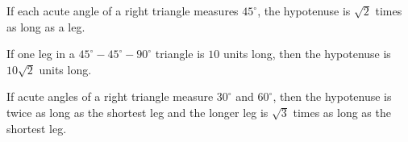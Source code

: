 \begin{theorem}
	If each acute angle of a right triangle measures $45^{\circ}$, the hypotenuse
	is $\sqrt{2}$ times as long as a leg.

	\begin{figure}[H]
		\centering


		\label{fig:45_45_90_triangle}
	\end{figure}
\end{theorem}

\begin{example}
	If one leg in a $45^{\circ}-45^{\circ}-90^{\circ}$ triangle is $10$ units
	long, then the hypotenuse is $10\sqrt{2}$ units long.
\end{example}

\begin{theorem}
	If acute angles of a right triangle measure $30^{\circ}$ and $60^{\circ}$,
	then the hypotenuse is twice as long as the shortest leg and the longer leg
	is $\sqrt{3}$ times as long as the shortest leg.

	\begin{figure}[H]
		\centering


		\label{fig:30_60_90_triangle}
	\end{figure}
\end{theorem}

